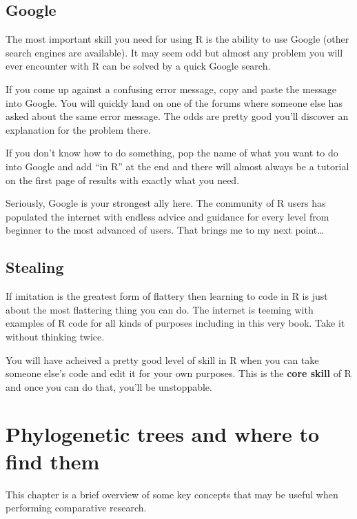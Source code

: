 \documentclass[
]{book}
\begin{document}
\hypertarget{google}{%
\section{Google}\label{google}}

The most important skill you need for using R is the ability to use Google (other search engines are available). It may seem odd but almost any problem you will ever encounter with R can be solved by a quick Google search.

If you come up against a confusing error message, copy and paste the message into Google. You will quickly land on one of the forums where someone else has asked about the same error message. The odds are pretty good you'll discover an explanation for the problem there.

If you don't know how to do something, pop the name of what you want to do into Google and add ``in R'' at the end and there will almost always be a tutorial on the first page of results with exactly what you need.

Seriously, Google is your strongest ally here. The community of R users has populated the internet with endless advice and guidance for every level from beginner to the most advanced of users. That brings me to my next point\ldots{}

\hypertarget{stealing}{%
\section{Stealing}\label{stealing}}

If imitation is the greatest form of flattery then learning to code in R is just about the most flattering thing you can do. The internet is teeming with examples of R code for all kinds of purposes including in this very book. Take it without thinking twice.

You will have acheived a pretty good level of skill in R when you can take someone else's code and edit it for your own purposes. This is the \textbf{core skill} of R and once you can do that, you'll be unstoppable.

\hypertarget{phylogenetics}{%
\chapter{Phylogenetic trees and where to find them}\label{phylogenetics}}

This chapter is a brief overview of some key concepts that may be useful when performing comparative research.
\end{document}
